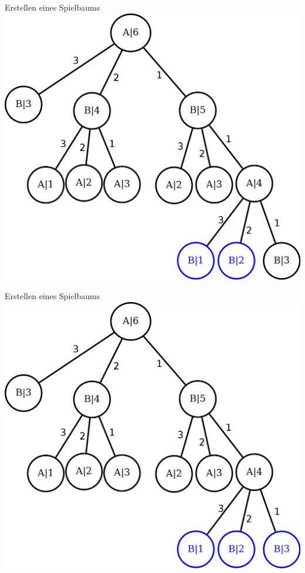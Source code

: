 \documentclass[18pt]{beamer}
\begin{document}
\begin{frame}{Erstellen eines Spielbaums}
\includegraphics[scale=0.4]{baum11.png}
\end{frame}

\begin{frame}{Erstellen eines Spielbaums}
\includegraphics[scale=0.4]{baum12.png}
\end{frame}
\end{document}
